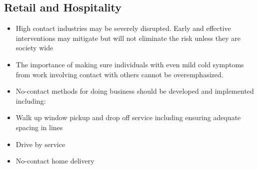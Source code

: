 \documentclass[onecolumn,journal]{IEEEtran}
\begin{document}
\begin{multicols}{2}
\section*{Retail and Hospitality}
\begin{itemize}
    \item High contact industries may be severely disrupted. Early and effective interventions may mitigate but will not eliminate the risk unless they are society wide
    \item The importance of making sure individuals with even mild cold symptoms from work involving contact with others cannot be overemphasized.
    \item No-contact methods for doing business should be developed and implemented including:
        \item Walk up window pickup and drop off service including ensuring adequate spacing in lines
        \item Drive by service
        \item No-contact home delivery
    
\end{itemize}


\end{multicols}

\vspace{2ex}







% 

\end{document}
